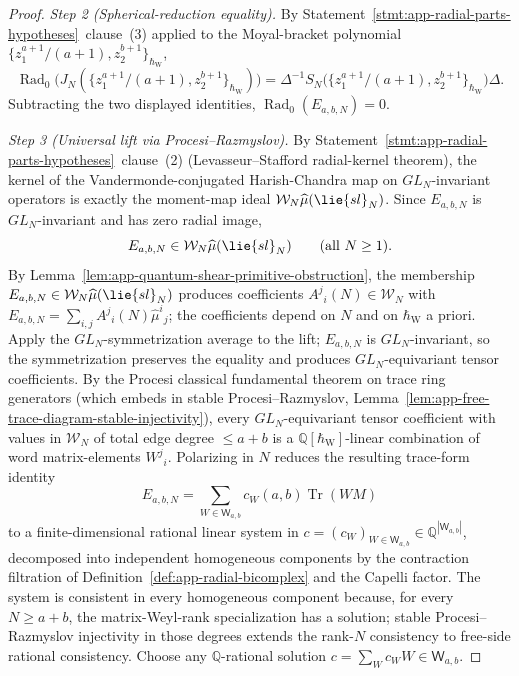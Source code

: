 \begin{proof}
  \emph{Step 2 (Spherical-reduction equality).}  By
  Statement~\ref{stmt:app-radial-parts-hypotheses}~clause~(3)
  applied to the Moyal-bracket polynomial
  \(\{z_1^{a+1}/(a+1),z_2^{b+1}\}_{\hbar_{\mathrm{W}}}\),
  \[
    \operatorname{Rad}_0\bigl(
      J_N(\{z_1^{a+1}/(a+1),z_2^{b+1}\}_{\hbar_{\mathrm{W}}})
    \bigr)
    =
    \Delta^{-1}S_N\!\bigl(
      \{z_1^{a+1}/(a+1),z_2^{b+1}\}_{\hbar_{\mathrm{W}}}
    \bigr)\Delta .
  \]
  Subtracting the two displayed identities,
  \(\operatorname{Rad}_0(E_{a,b,N})=0\).

  \emph{Step 3 (Universal lift via Procesi--Razmyslov).}  By
  Statement~\ref{stmt:app-radial-parts-hypotheses}~clause~(2)
  (Levasseur--Stafford radial-kernel theorem), the kernel of the
  Vandermonde-conjugated Harish-Chandra map on
  \(GL_N\)-invariant operators is exactly the moment-map ideal
  \(\mathcal W_N\widehat\mu(\lie{sl}_N)\).  Since
  \(E_{a,b,N}\) is \(GL_N\)-invariant and has zero radial image,
  \[
    E_{a,b,N}\in\mathcal W_N\widehat\mu(\lie{sl}_N)\qquad
    (\text{all }N\geq1).
  \]
  By
  Lemma~\ref{lem:app-quantum-shear-primitive-obstruction}, the
  membership \(E_{a,b,N}\in\mathcal W_N\widehat\mu(\lie{sl}_N)\)
  produces coefficients \(A^j{}_i(N)\in\mathcal W_N\) with
  \(E_{a,b,N}=\sum_{i,j}A^j{}_i(N)\widehat\mu^i{}_j\); the
  coefficients depend on \(N\) and on \(\hbar_{\mathrm{W}}\) a priori.  Apply the
  \(GL_N\)-symmetrization average to the lift; \(E_{a,b,N}\) is
  \(GL_N\)-invariant, so the symmetrization preserves the equality and
  produces \(GL_N\)-equivariant tensor coefficients.  By the Procesi
  classical fundamental theorem on trace ring generators (which
  embeds in stable Procesi--Razmyslov,
  Lemma~\ref{lem:app-free-trace-diagram-stable-injectivity}), every
  \(GL_N\)-equivariant tensor coefficient with values in
  \(\mathcal W_N\) of total edge degree \(\leq a+b\) is a
  \(\mathbb Q[\hbar_{\mathrm{W}}]\)-linear combination of word matrix-elements
  \(W^j{}_i\).  Polarizing in \(N\) reduces the resulting trace-form
  identity
  \[
    E_{a,b,N}=\sum_{W\in\mathsf W_{a,b}}c_W(a,b)\operatorname{Tr}(WM)
  \]
  to a finite-dimensional rational linear system in
  \(c=(c_W)_{W\in\mathsf W_{a,b}}\in\mathbb Q^{|\mathsf W_{a,b}|}\),
  decomposed into independent homogeneous components by the
  contraction filtration of
  Definition~\ref{def:app-radial-bicomplex} and the Capelli factor.
  The system is consistent in every homogeneous component because,
  for every \(N\geq a+b\), the matrix-Weyl-rank specialization has a
	  solution; stable Procesi--Razmyslov injectivity in those degrees
	  extends the rank-\(N\) consistency to free-side rational
  consistency.  Choose any \(\mathbb Q\)-rational solution
  \(c=\sum_W c_W W\in\mathsf W_{a,b}\).


\end{proof}
